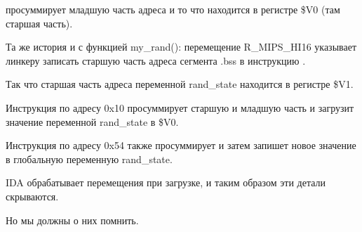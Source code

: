\SW просуммирует младшую часть адреса и то что находится в регистре \$V0 (там старшая часть).

Та же история и с функцией my\_rand(): перемещение R\_MIPS\_HI16 указывает линкеру записать старшую часть
адреса сегмента .bss в инструкцию \LUI.

Так что старшая часть адреса переменной rand\_state находится в регистре \$V1.

Инструкция \LW по адресу 0x10 просуммирует старшую и младшую часть и загрузит значение переменной 
rand\_state в \$V0.

Инструкция \SW по адресу 0x54 также просуммирует и затем запишет новое значение в глобальную переменную
rand\_state.

IDA обрабатывает перемещения при загрузке, и таким образом эти детали скрываются.

Но мы должны о них помнить.

